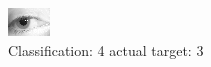 \begin{figure}[h!]
\begin{center}
\includegraphics[width=0.60\columnwidth]{figures/ID1399_class_4_target_3.png}
\end{center}
\caption{ Classification: 4 actual target: 3}
\label{fig:ID1399_class_4_target_3}
\end{figure}
